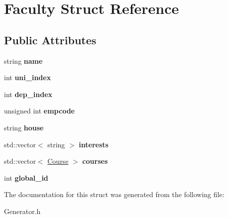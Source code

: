 \hypertarget{struct_faculty}{\section{Faculty Struct Reference}
\label{struct_faculty}
}
\subsection*{Public Attributes}
\begin{DoxyCompactItemize}
\item 
\hypertarget{struct_faculty_a0eb97b036ccf1b3f242b1df2335a48b8}{string {\bfseries name}}\label{struct_faculty_a0eb97b036ccf1b3f242b1df2335a48b8}

\item 
\hypertarget{struct_faculty_ab3bc5d4c873debc4ec23429e18b63952}{int {\bfseries uni\-\_\-index}}\label{struct_faculty_ab3bc5d4c873debc4ec23429e18b63952}

\item 
\hypertarget{struct_faculty_a9e7014aaf3cecb3539c312788905274c}{int {\bfseries dep\-\_\-index}}\label{struct_faculty_a9e7014aaf3cecb3539c312788905274c}

\item 
\hypertarget{struct_faculty_a228bf1d12b97249ecf3b5fb482d1d761}{unsigned int {\bfseries empcode}}\label{struct_faculty_a228bf1d12b97249ecf3b5fb482d1d761}

\item 
\hypertarget{struct_faculty_ae7ba80a707bbd771f8fa9fd28894a14d}{string {\bfseries house}}\label{struct_faculty_ae7ba80a707bbd771f8fa9fd28894a14d}

\item 
\hypertarget{struct_faculty_af488ef7c0391bba78fce4373e6435817}{std\-::vector$<$ string $>$ {\bfseries interests}}\label{struct_faculty_af488ef7c0391bba78fce4373e6435817}

\item 
\hypertarget{struct_faculty_a5207ffa5a60a09dc0fa95bcb66ba07bf}{std\-::vector$<$ \hyperlink{struct_course}{Course} $>$ {\bfseries courses}}\label{struct_faculty_a5207ffa5a60a09dc0fa95bcb66ba07bf}

\item 
\hypertarget{struct_faculty_a9e723dee397bfdd022fe5deaa6c9ad3c}{int {\bfseries global\-\_\-id}}\label{struct_faculty_a9e723dee397bfdd022fe5deaa6c9ad3c}

\end{DoxyCompactItemize}


The documentation for this struct was generated from the following file\-:\begin{DoxyCompactItemize}
\item 
Generator.\-h\end{DoxyCompactItemize}
